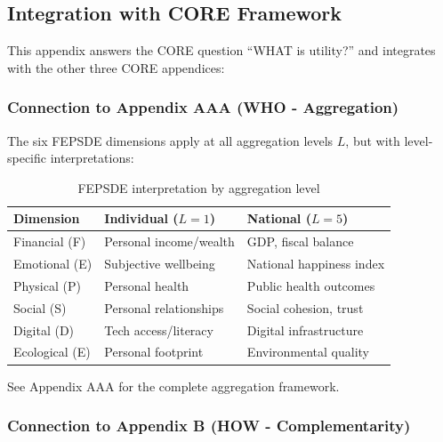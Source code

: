 


\subsection{Integration with CORE Framework}
\label{sec:C-core-integration}

This appendix answers the CORE question ``WHAT is utility?'' and integrates 
with the other three CORE appendices:

\subsubsection{Connection to Appendix AAA (WHO - Aggregation)}

The six FEPSDE dimensions apply at all aggregation levels $L$, but with 
level-specific interpretations:

\begin{table}[h]
\centering
\small
\begin{tabular}{l|ll}
\toprule
\textbf{Dimension} & \textbf{Individual ($L=1$)} & \textbf{National ($L=5$)} \\
\midrule
Financial (F) & Personal income/wealth & GDP, fiscal balance \\
Emotional (E) & Subjective wellbeing & National happiness index \\
Physical (P) & Personal health & Public health outcomes \\
Social (S) & Personal relationships & Social cohesion, trust \\
Digital (D) & Tech access/literacy & Digital infrastructure \\
Ecological (E) & Personal footprint & Environmental quality \\
\bottomrule
\end{tabular}
\caption{FEPSDE interpretation by aggregation level}
\end{table}

See Appendix AAA for the complete aggregation framework.

\subsubsection{Connection to Appendix B (HOW - Complementarity)}

